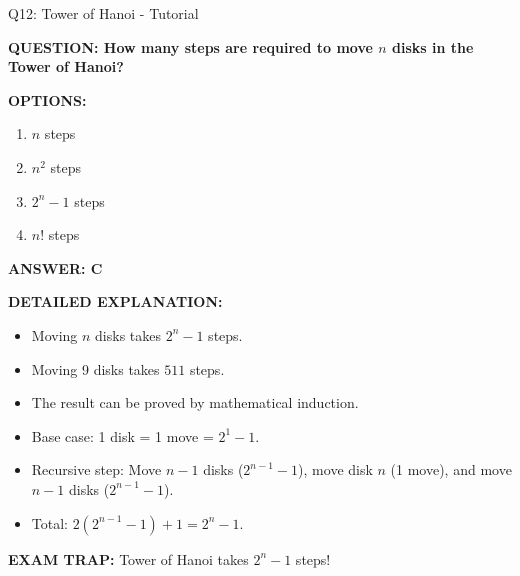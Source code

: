 \documentclass[8pt]{beamer}
\begin{document}
\begin{frame}{Q12: Tower of Hanoi - Tutorial}
	\fontsize{6.5}{7.5}\selectfont
	
	\textbf{QUESTION: How many steps are required to move $n$ disks in the Tower of Hanoi?}
	
	\vspace{0.1cm}
	\textbf{OPTIONS:}
	\begin{enumerate}
		\item $n$ steps
		\item $n^2$ steps
		\item $2^n - 1$ steps
		\item $n!$ steps
	\end{enumerate}
	
	\vspace{0.1cm}
	\textcolor{myblue}{\textbf{ANSWER: C}}
	
	\vspace{0.1cm}
	\textbf{DETAILED EXPLANATION:}
	\begin{itemize}
		\item Moving $n$ disks takes $2^n - 1$ steps.
		\item Moving 9 disks takes $511$ steps.
		\item The result can be proved by mathematical induction.
		\item Base case: 1 disk = 1 move = $2^1 - 1$.
		\item Recursive step: Move $n-1$ disks ($2^{n-1} - 1$), move disk $n$ (1 move), and move $n-1$ disks ($2^{n-1} - 1$).
		\item Total: $2(2^{n-1} - 1) + 1 = 2^n - 1$.
	\end{itemize}
	
	\vspace{0.1cm}
	\textcolor{myred}{\textbf{EXAM TRAP:}} 
	Tower of Hanoi takes \textcolor{myblue}{$2^n - 1$} steps!
\end{frame}
	
\end{document}
